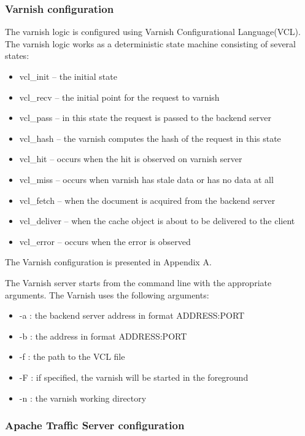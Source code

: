 \subsubsection{Varnish configuration}

The varnish logic is configured using Varnish Configurational Language(VCL). The varnish logic works as a deterministic state machine consisting of several states:

\begin{itemize}
	\item vcl\_init -- the initial state 
	\item vcl\_recv -- the initial point for the request to varnish
	\item vcl\_pass -- in this state the request is passed to the backend server
	\item vcl\_hash -- the varnish computes the hash of the request in this state
	\item vcl\_hit -- occurs when the hit is observed on varnish server
	\item vcl\_miss -- occurs when varnish has stale data or has no data at all
	\item vcl\_fetch -- when the document is acquired from the backend server
	\item vcl\_deliver -- when the cache object is about to be delivered to the client
	\item vcl\_error -- occurs when the error is observed
\end{itemize}

The Varnish configuration is presented in Appendix A.

The Varnish server starts from the command line with the appropriate arguments. The Varnish uses the following arguments:

\begin{itemize}
	\item -a : the backend server address in format ADDRESS:PORT
	\item -b : the  address in format ADDRESS:PORT
	\item -f : the path to the VCL file 
	\item -F : if specified, the varnish will be started in the foreground
	\item -n : the varnish working directory
\end{itemize} 

\subsubsection{Apache Traffic Server configuration}

